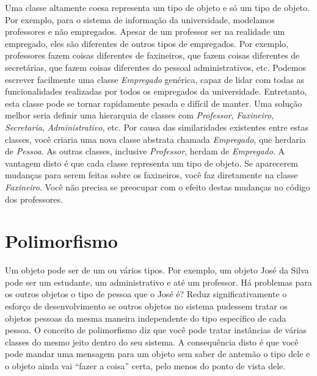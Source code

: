 \documentclass[
	11pt,				%
	openright,
	twoside,			%
	a4paper,			%
	english,			%
	french,
	brazil,				%
	sumario=tradicional
	]{abntex2}
\begin{document}
Uma classe altamente coesa representa um tipo de objeto e só um tipo de objeto. Por exemplo, para o sistema de informação da universidade, modelamos professores e não empregados. Apesar de um professor ser na realidade um empregado, eles são diferentes de outros tipos de empregados. Por exemplo, professores fazem coisas diferentes de faxineiros, que fazem coisas diferentes de secretárias, que fazem coisas diferentes do pessoal administrativos, etc. Podemos escrever facilmente uma classe \emph{Empregado} genérica, capaz de lidar com todas as funcionalidades realizadas por todos os empregados da universidade. Entretanto, esta classe pode se tornar rapidamente pesada e difícil de manter. Uma solução melhor seria definir uma hierarquia de classes com \emph{Professor}, \emph{Faxineiro}, \emph{Secretaria}, \emph{Administrativo}, etc. Por causa das similaridades existentes entre estas classes, você criaria uma nova classe abstrata chamada \emph{Empregado}, que herdaria de \emph{Pessoa}. As outras classes, inclusive \emph{Professor}, herdam de \emph{Empregado}. A vantagem disto é que cada classe representa um tipo de objeto. Se aparecerem mudanças para serem feitas sobre os faxineiros, você faz diretamente na classe \emph{Faxineiro}. Você não precisa se preocupar com o efeito destas mudanças no código dos professores. 

\section{Polimorfismo}

Um objeto pode ser de um ou vários tipos. Por exemplo, um objeto José da Silva pode ser um estudante, um administrativo e até um professor. Há problemas para os outros objetos o tipo de pessoa que o José é? Reduz significativamente o esforço de desenvolvimento se outros objetos no sistema pudessem tratar os objetos pessoas da mesma maneira independente do tipo específico de cada pessoa. O conceito de polimorfismo diz que você pode tratar instâncias de várias classes do mesmo jeito dentro do seu sistema. A consequência disto é que você pode mandar uma mensagem para um objeto sem saber de antemão o tipo dele e o objeto ainda vai ``fazer a coisa'' certa, pelo menos do ponto de vista dele.

\end{document}
